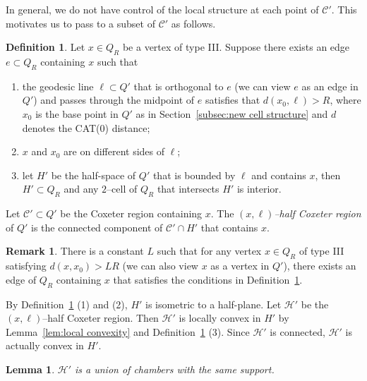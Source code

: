 \documentclass[11pt]{amsart}
\newcommand {\C}{\mathcal C}
\newcommand {\h}{\mathcal H}
\newtheorem{lemma}[theorem]{Lemma}
\theoremstyle{definition}
\newtheorem{definition}[theorem]{Definition}
\newtheorem{remark}[theorem]{Remark}
\begin{document}
In general, we do not have control of the local structure at each point of $\C'$. This motivates us to pass to a subset of $\C'$ as follows.

\begin{definition}
	\label{def:half Coxeter region}
Let $x\in Q_R$ be a vertex of type III. Suppose there exists an edge $e\subset Q_R$ containing $x$ such that
\begin{enumerate}
	\item the geodesic line $\ell\subset Q'$ that is orthogonal to $e$ (we can view $e$ as an edge in $Q'$) and passes through the midpoint of $e$ satisfies that $d(x_0,\ell)>R$, where $x_0$ is the base point in $Q'$ as in Section~\ref{subsec:new cell structure} and $d$ denotes the CAT(0) distance;
	\item $x$ and $x_0$ are on different sides of $\ell$;
	\item let $H'$ be the half-space of $Q'$ that is bounded by $\ell$ and contains $x$, then $H'\subset Q_R$ and any $2$--cell of $Q_R$ that intersects $H'$ is interior.
\end{enumerate} 
Let $\C'\subset Q'$ be the Coxeter region containing $x$. The \emph{$(x,\ell)$--half Coxeter region} of $Q'$ is the connected component of $\C'\cap H'$ that contains $x$.
\end{definition}

\begin{remark}
There is a constant $L$ such that for any vertex $x\in Q_R$ of type III satisfying $d(x,x_0)>LR$ (we can also view $x$ as a vertex in $Q'$), there exists an edge of $Q_R$ containing $x$ that satisfies the conditions in Definition~\ref{def:half Coxeter region}.
\end{remark}


By Definition~\ref{def:half Coxeter region} (1) and (2), $H'$ is isometric to a half-plane. Let $\h'$ be the $(x,\ell)$--half Coxeter region. Then $\h'$ is locally convex in $H'$ by Lemma~\ref{lem:local convexity} and Definition~\ref{def:half Coxeter region} (3). Since $\h'$ is connected, $\h'$ is actually convex in $H'$. 

\begin{lemma}
	\label{lem:union of chambers}
$\h'$ is a union of chambers with the same support. 
\end{lemma}
\end{document}
